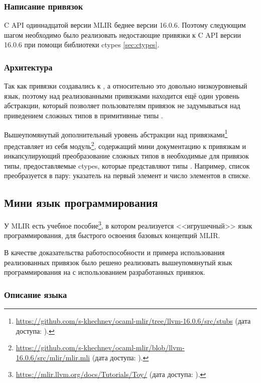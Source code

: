 \subsubsection{Написание привязок}

C API одиннадцатой версии MLIR беднее версии 16.0.6. Поэтому следующим шагом необходимо было реализовать недостающие привязки к C API версии 16.0.6 при помощи библиотеки ctypes \ref{sec:ctypes}.

\subsubsection{Архитектура}

Так как привязки создавались к \C{}, а \C{} относительно \OCaml{} это довольно низкоуровневый язык, поэтому над реализованными привязками находится ещё один уровень абстракции, который позволяет пользователям привязок не задумываться над приведением сложных \OCaml{} типов в примитивные типы \C{}.

Вышеупомянутый дополнительный уровень абстракции над привязками\footnote{\url{https://github.com/s-khechnev/ocaml-mlir/tree/llvm-16.0.6/src/stubs} (дата доступа:   ).} представляет из себя модуль\footnote{\url{https://github.com/s-khechnev/ocaml-mlir/blob/llvm-16.0.6/src/mlir/mlir.mli} (дата доступа:   ).}, содержащий мини документацию к привязкам и инкапсулирующий преобразование сложных \OCaml{} типов в необходимые для привязок типы, предоставляемые ctypes, которые представляют типы \C{}. Например, список \OCaml{} преобразуется в пару: указатель на первый элемент и число элементов в списке.

\subsection{Мини язык программирования}

У MLIR есть учебное пособие\footnote{\url{https://mlir.llvm.org/docs/Tutorials/Toy/} (дата доступа:   ).}, в котором реализуется <<игрушечный>> язык программирования, для быстрого освоения базовых концепций MLIR.

В качестве доказательства работоспособности и примера использования реализованных привязок было решено реализовать вышеупомянутый язык программирования на \OCaml{} с использованием разработанных привязок.

\subsubsection{Описание языка}

